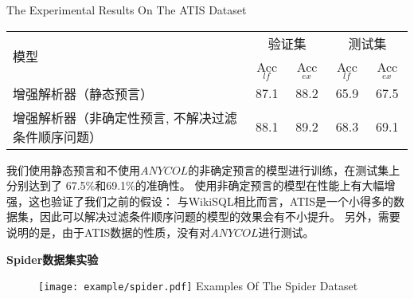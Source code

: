 \begin{table}[!htpb]
    {The Experimental Results On The ATIS Dataset}
  \label{tab:asjjsdsyjg}
  \centering
  \begin{threeparttable}[b]
     \begin{tabular}{lcccc}
      \toprule
      \multirow{2}{10mm}{模型}&\multicolumn{2}{c}{验证集} & \multicolumn{2}{c}{测试集}\\
      \cmidrule(lr){2-3}\cmidrule(lr){4-5}
      & Acc$_{lf}$ & Acc$_{ex}$ & Acc$_{lf}$ & Acc$_{ex}$\\
      \midrule
      增强解析器（静态预言） & 87.1 & 88.2 & 65.9 & 67.5\\
      增强解析器（非确定性预言, 不解决过滤条件顺序问题） & 88.1 & 89.2 & 68.3 & 69.1\\
      \bottomrule
    \end{tabular}
  \end{threeparttable}
\end{table}

我们使用静态预言和不使用$ANYCOL$的非确定预言的模型进行训练，在测试集上分别达到了 67.5\%和69.1\%的准确性。
使用非确定预言的模型在性能上有大幅增强，这也验证了我们之前的假设：
与WikiSQL相比而言，ATIS是一个小得多的数据集，因此可以解决过滤条件顺序问题的模型的效果会有不小提升。
另外，需要说明的是，由于ATIS数据的性质，没有对$ANYCOL$进行测试。

\textbf{Spider数据集实验}

\begin{figure}[!htp]
  \centering
  \texttt{[image: example/spider.pdf]}
    {Examples Of The Spider Dataset}
  \label{fig:spiderxample}
\end{figure}

